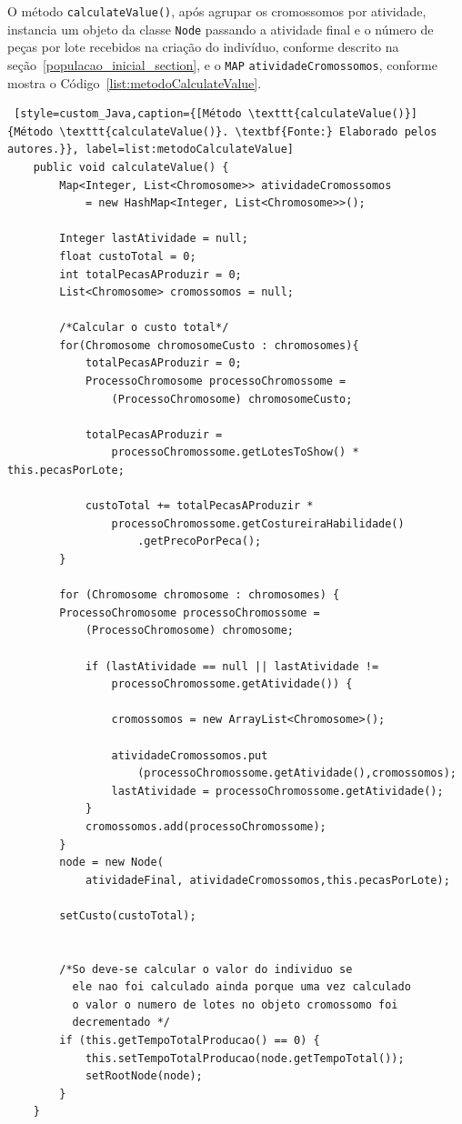 \par O método \texttt{calculateValue()}, após agrupar os cromossomos por atividade, 
 instancia um objeto da classe \texttt{Node} passando a atividade final e o número de 
 peças por lote recebidos na criação do indivíduo, conforme descrito na seção~\ref{populacao_inicial_section}, e o \texttt{MAP} 
 \texttt{atividade\-Cromossomos}, conforme mostra o
 Código~\ref{list:metodoCalculateValue}.


\begin{lstlisting} [style=custom_Java,caption={[Método \texttt{calculateValue()}]
{Método \texttt{calculateValue()}. \textbf{Fonte:} Elaborado pelos autores.}}, label=list:metodoCalculateValue]
	public void calculateValue() {
		Map<Integer, List<Chromosome>> atividadeCromossomos 
			= new HashMap<Integer, List<Chromosome>>();
		
		Integer lastAtividade = null;
		float custoTotal = 0;
		int totalPecasAProduzir = 0;
		List<Chromosome> cromossomos = null;
		
		/*Calcular o custo total*/
		for(Chromosome chromosomeCusto : chromosomes){
			totalPecasAProduzir = 0;
			ProcessoChromosome processoChromossome = 
				(ProcessoChromosome) chromosomeCusto;
				
			totalPecasAProduzir = 
				processoChromossome.getLotesToShow() * this.pecasPorLote;
				
			custoTotal += totalPecasAProduzir * 
				processoChromossome.getCostureiraHabilidade()
					.getPrecoPorPeca();
		}
		
		for (Chromosome chromosome : chromosomes) {
		ProcessoChromosome processoChromossome = 
			(ProcessoChromosome) chromosome;
		
			if (lastAtividade == null || lastAtividade != 
				processoChromossome.getAtividade()) {
				
				cromossomos = new ArrayList<Chromosome>();
				
				atividadeCromossomos.put
					(processoChromossome.getAtividade(),cromossomos);
				lastAtividade = processoChromossome.getAtividade();
			}
			cromossomos.add(processoChromossome);
		}
		node = new Node(
			atividadeFinal, atividadeCromossomos,this.pecasPorLote);
		
		setCusto(custoTotal);
		
		
		/*So deve-se calcular o valor do individuo se 
		  ele nao foi calculado ainda porque uma vez calculado 
		  o valor o numero de lotes no objeto cromossomo foi 
		  decrementado */
		if (this.getTempoTotalProducao() == 0) {
			this.setTempoTotalProducao(node.getTempoTotal());
			setRootNode(node);
		}
	}

\end{lstlisting}



